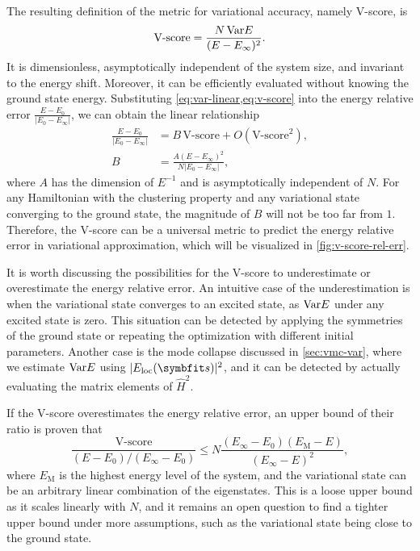 The resulting definition of the metric for variational accuracy, namely V-score, is
\begin{equation}
\text{V-score} = \frac{N\,\mathrm{Var} E}{(E - E_\infty)^2}.
\label{eq:v-score}
\end{equation}
It is dimensionless, asymptotically independent of the system size, and invariant to the energy shift. Moreover, it can be efficiently evaluated without knowing the ground state energy. Substituting \cref{eq:var-linear,eq:v-score} into the energy relative error $\frac{E - E_0}{|E_0 - E_\infty|}$, we can obtain the linear relationship
\begin{align}
\frac{E - E_0}{|E_0 - E_\infty|} &= B\,\text{V-score} + O(\text{V-score}^2), \label{eq:v-score-rel-err} \\
B &= \frac{A (E - E_\infty)^2}{N |E_0 - E_\infty|},
\end{align}
where $A$ has the dimension of $E^{-1}$ and is asymptotically independent of $N$. For any Hamiltonian with the clustering property and any variational state converging to the ground state, the magnitude of $B$ will not be too far from $1$. Therefore, the V-score can be a universal metric to predict the energy relative error in variational approximation, which will be visualized in \cref{fig:v-score-rel-err}.

It is worth discussing the possibilities for the V-score to underestimate or overestimate the energy relative error. An intuitive case of the underestimation is when the variational state converges to an excited state, as $\mathrm{Var} E$ under any excited state is zero. This situation can be detected by applying the symmetries of the ground state or repeating the optimization with different initial parameters. Another case is the mode collapse discussed in \cref{sec:vmc-var}, where we estimate $\mathrm{Var} E$ using $|E_\text{loc}(\vs)|^2$, and it can be detected by actually evaluating the matrix elements of $\hat{H}^2$.

If the V-score overestimates the energy relative error, an upper bound of their ratio is proven that
\begin{equation}
\frac{\text{V-score}}{(E - E_0) / (E_\infty - E_0)} \le N \frac{(E_\infty - E_0) (E_\text{M} - E)}{(E_\infty - E)^2},
\label{eq:v-score-bound}
\end{equation}
where $E_\text{M}$ is the highest energy level of the system, and the variational state can be an arbitrary linear combination of the eigenstates. This is a loose upper bound as it scales linearly with $N$, and it remains an open question to find a tighter upper bound under more assumptions, such as the variational state being close to the ground state.

